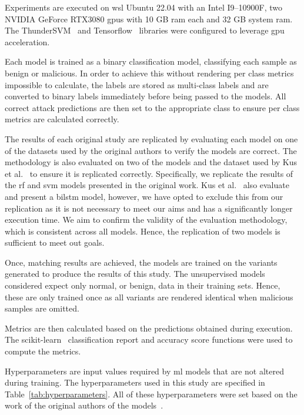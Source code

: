 Experiments are executed on \gls{wsl} Ubuntu 22.04 with an Intel I9--10900F,
two NVIDIA GeForce RTX3080 \gls{gpu}s with 10 GB \gls{ram} each and 32 GB
system \gls{ram}. The ThunderSVM~\cite{ThunderSVM} and
Tensorflow~\cite{tensorflow} libraries were configured to leverage \gls{gpu}
acceleration.

Each model is trained as a binary classification model, classifying each sample
as benign or malicious. In order to achieve this without rendering per class
metrics impossible to calculate, the labels are stored as multi-class labels
and are converted to binary labels immediately before being passed to the
models. All correct attack predictions are then set to the appropriate class to
ensure per class metrics are calculated correctly.

The results of each original study are replicated by evaluating each model on
one of the datasets used by the original authors to verify the models are
correct. The methodology is also evaluated on two of the models and the dataset
used by Kus et al.~\cite{Kus} to ensure it is replicated correctly.
Specifically, we replicate the results of the \gls{rf} and \gls{svm} models
presented in the original work. Kus et al.~\cite{Kus} also evaluate and present
a \gls{bilstm} model, however, we have opted to exclude this from our
replication as it is not necessary to meet our aims and has a significantly
longer execution time. We aim to confirm the validity of the evaluation
methodology, which is consistent across all models. Hence, the replication of
two models is sufficient to meet out goals.

Once, matching results are achieved, the models are trained on the variants
generated to produce the results of this study. The unsupervised models
considered expect only normal, or benign, data in their training sets. Hence,
these are only trained once as all variants are rendered identical when
malicious samples are omitted.

Metrics are then calculated based on the predictions obtained during execution.
The scikit-learn~\cite{scikit-learn} classification report and accuracy score
functions were used to compute the metrics.

Hyperparameters are input values required by \gls{ml} models that are not
altered during training. The hyperparameters used in this study are specified
in Table~\ref{tab:hyperparameters}. All of these hyperparameters were set based
on the work of the original authors of the models~\cite{Karatas, Pu, Cao}.

